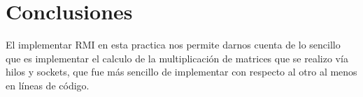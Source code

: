 \documentclass[10pt,executivepaper]{article}
\begin{document}
\section{Conclusiones}
El implementar RMI en esta practica nos permite darnos cuenta de lo sencillo que es implementar el calculo de la multiplicación de matrices que se realizo vía hilos y sockets, que fue más sencillo de implementar con respecto al otro al menos en líneas de código.
\end{document}

